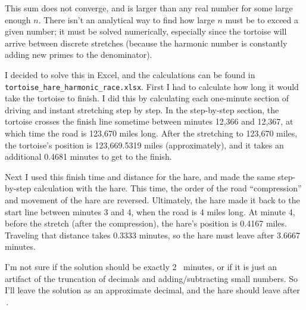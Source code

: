 \documentclass{article}
\begin{document}
This sum does not converge, and is larger than any real number for some large enough $n$.
There isn't an analytical way to find how large $n$ must be to exceed a given number; it must be solved numerically, especially since the tortoise will arrive between discrete stretches (because the harmonic number is constantly adding new primes to the denominator).

I decided to solve this in Excel, and the calculations can be found in \texttt{tortoise\_hare\_harmonic\_race.xlsx}.
First I had to calculate how long it would take the tortoise to finish.
I did this by calculating each one-minute section of driving and instant stretching step by step.
In the step-by-step section, the tortoise crosses the finish line sometime between minutes 12,366 and 12,367, at which time the road is 123,670 miles long.
After the stretching to 123,670 miles, the tortoise's position is 123,669.5319 miles (approximately), and it takes an additional 0.4681 minutes to get to the finish.

Next I used this finish time and distance for the hare, and made the same step-by-step calculation with the hare.
This time, the order of the road ``compression'' and movement of the hare are reversed.
Ultimately, the hare made it back to the start line between minutes 3 and 4, when the road is 4 miles long.
At minute 4, before the stretch (after the compression), the hare's position is 0.4167 miles.
Traveling that distance takes 0.3333 minutes, so the hare must leave after 3.6667 minutes.

I'm not sure if the solution should be exactly 2~ minutes, or if it is just an artifact of the truncation of decimals and adding/subtracting small numbers.
So I'll leave the solution as an approximate decimal, and the hare should leave after
\,.
\end{document}
